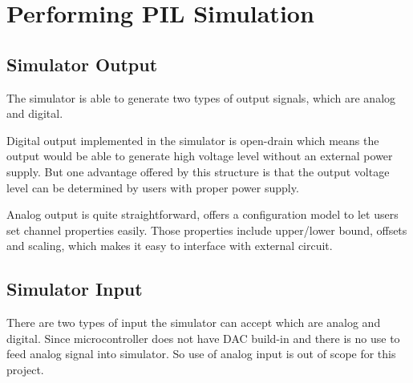 \section{Performing \gls{PIL} Simulation}\label{sec:perform_pil}
\subsection{Simulator Output}
The simulator is able to generate two types of output signals, which are analog and digital.

Digital output implemented in the simulator is open-drain which means the output would be able to generate high voltage level without an external power supply. But one advantage offered by this structure is that the output voltage level can be determined by users with proper power supply. 

Analog output is quite straightforward, \rtlab offers a configuration model to let users set channel properties easily. Those properties include upper/lower bound, offsets and scaling, which makes it easy to interface with external circuit. 

\subsection{Simulator Input}
There are two types of input the simulator can accept which are analog and digital. Since microcontroller does not have DAC build-in and there is no use to feed analog signal into simulator. So use of analog input is out of scope for this project. 

